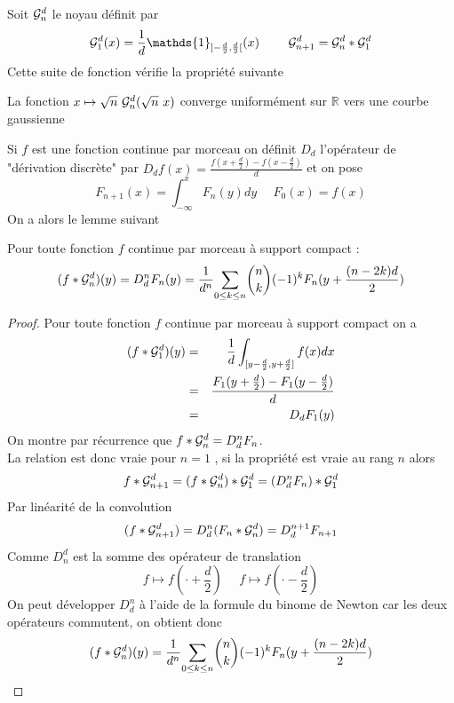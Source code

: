 Soit $\mathcal{G}_n^d$ le noyau définit par 
\begin{equation*}
\Gcal_1^d(x)=\frac{1}{d}\mathds{1}_{]-\frac{d}{2},\frac{d}{2}[}(x) ~~~~~~~\Gcal_{n+1}^d= \Gcal_n^d * \Gcal_1^d 
\label{formule_convol_n_int}
\end{equation*}
Cette suite de fonction vérifie la propriété suivante
\begin{prop}
La fonction $x\mapsto \sqrt{n}~\mathcal{G}_n^d(\sqrt{n}~x)$ converge uniformément sur $\mathbb{R}$ vers une courbe gaussienne 
\end{prop}
Si $f$ est une fonction continue par morceau on définit $D_d$ l'opérateur de "dérivation discrète" par $D_d f(x)=\frac{f(x+\frac{d}{2})-f(x-\frac{d}{2})}{d}$  et on pose
\begin{equation*}
F_{n+1}(x)= \int_{-\infty}^{x}F_{n}(y)dy~~~~~~F_{0}(x)= f(x)
\end{equation*}
On a alors le lemme suivant 
\begin{prop} Pour toute fonction $f$ continue par morceau à support compact :
\begin{equation}
 (f*\mathcal{G}_n^d)(y)=D_d^n F_{n}(y)= \frac{1}{d^n}\underset{0 \le k\le n}{\sum} \binom{n}{k}(-1)^{k} F_{n}(y+\frac{(n-2k)d}{2})
\end{equation}
\end{prop}
\begin{proof}
Pour toute fonction $f$ continue par morceau à support compact on a 
\begin{eqnarray*}
(f * \mathcal{G}_1^d )(y)&=&\frac{1}{d} \int_{[y-\frac{d}{2},y+\frac{d}{2}]} f(x) dx\\
               &=&\frac{F_{1}(y+\frac{d}{2})-F_{1}(y-\frac{d}{2})}{d}\\
               &=&D_d F_{1}(y)
\end{eqnarray*}
On montre par récurrence que $ f*\mathcal{G}_n^d=D_d^n F_{n}$.\\
La relation est donc vraie pour $n=1$ , si la propriété est vraie au rang $n$ alors
\begin{equation*}
f*\mathcal{G}_{n+1}^{d}=(f * \mathcal{G}_{n}^d) * \mathcal{G}_{1}^{d}= (D_d^n F_{n})*\mathcal{G}_1^d 
\end{equation*}
Par linéarité de la convolution
\begin{equation*}
(f*\mathcal{G}_{n+1}^{d})= D_d^n (F_{n}*\mathcal{G}_n^d) = D_d^{n+1} F_{n+1}
\end{equation*}
Comme $D_n^d$ est la somme des opérateur de translation
\begin{equation*}
f\mapsto f(\cdot+\frac{d}{2})~~~~~~f\mapsto f(\cdot-\frac{d}{2})
\end{equation*}
On peut développer $D_d^n$ à l'aide de la formule du binome de Newton car les deux opérateurs commutent, on obtient donc
\begin{equation*}
(f*\mathcal{G}_n^d)(y) = \frac{1}{d^n}\underset{0 \le k\le n}{\sum} \binom{n}{k}(-1)^{k} F_{n}(y+\frac{(n-2k)d}{2})
\end{equation*}

\end{proof}
